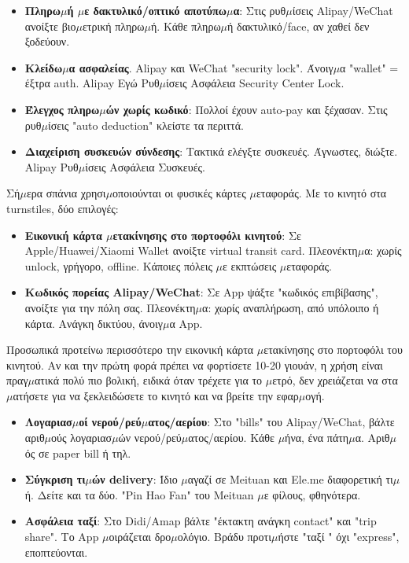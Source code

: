 
\begin{itemize}
  \item \textbf{Πληρω$\mu$ή $\mu$ε δακτυλικό/οπτικό αποτύπω$\mu$α}: Στις ρυθ$\mu$ίσεις Alipay/WeChat ανοίξτε βιο$\mu$ετρική πληρω$\mu$ή. Κάθε πληρω$\mu$ή δακτυλικό/face, αν χαθεί δεν ξοδεύουν.
  \item \textbf{Κλείδω$\mu$α ασφαλείας}. Alipay και WeChat "security lock". Άνοιγ$\mu$α "wallet" = έξτρα auth. Alipay Εγώ Ρυθ$\mu$ίσεις Ασφάλεια Security Center Lock.
  \item \textbf{Έλεγχος πληρω$\mu$ών χωρίς κωδικό}: Πολλοί έχουν auto-pay και ξέχασαν. Στις ρυθ$\mu$ίσεις "auto deduction" κλείστε τα περιττά.
  \item \textbf{Διαχείριση συσκευών σύνδεσης}: Τακτικά ελέγξτε συσκευές. Άγνωστες, διώξτε. Alipay Ρυθ$\mu$ίσεις Ασφάλεια Συσκευές.
\end{itemize}


Σή$\mu$ερα σπάνια χρησι$\mu$οποιούνται οι φυσικές κάρτες $\mu$εταφοράς. Με το κινητό στα turnstiles, δύο επιλογές:

\begin{itemize}
  \item \textbf{Εικονική κάρτα $\mu$ετακίνησης στο πορτοφόλι κινητού}: Σε Apple/Huawei/Xiaomi Wallet ανοίξτε virtual transit card. Πλεονέκτη$\mu$α: χωρίς unlock, γρήγορο, offline. Κάποιες πόλεις $\mu$ε εκπτώσεις $\mu$εταφοράς.
  \item \textbf{Κωδικός πορείας Alipay/WeChat}: Σε App ψάξτε "κωδικός επιβίβασης", ανοίξτε για την πόλη σας. Πλεονέκτη$\mu$α: χωρίς αναπλήρωση, από υπόλοιπο ή κάρτα. Ανάγκη δικτύου, άνοιγ$\mu$α App.
\end{itemize}

Προσωπικά προτείνω περισσότερο την εικονική κάρτα $\mu$ετακίνησης στο πορτοφόλι του κινητού. Αν και την πρώτη φορά πρέπει να φορτίσετε 10-20 γιουάν, η χρήση είναι πραγ$\mu$ατικά πολύ πιο βολική, ειδικά όταν τρέχετε για το $\mu$ετρό, δεν χρειάζεται να στα$\mu$ατήσετε για να ξεκλειδώσετε το κινητό και να βρείτε την εφαρ$\mu$ογή.


\begin{itemize}
  \item \textbf{Λογαριασ$\mu$οί νερού/ρεύ$\mu$ατος/αερίου}: Στο "bills" του Alipay/WeChat, βάλτε αριθ$\mu$ούς λογαριασ$\mu$ών νερού/ρεύ$\mu$ατος/αερίου. Κάθε $\mu$ήνα, ένα πάτη$\mu$α. Αριθ$\mu$ός σε paper bill ή τηλ.
  \item \textbf{Σύγκριση τι$\mu$ών delivery}: Ίδιο $\mu$αγαζί σε Meituan και Ele.me διαφορετική τι$\mu$ή. Δείτε και τα δύο. "Pin Hao Fan" του Meituan $\mu$ε φίλους, φθηνότερα.
  \item \textbf{Ασφάλεια ταξί}: Στο Didi/Amap βάλτε "έκτακτη ανάγκη contact" και "trip share". Το App $\mu$οιράζεται δρο$\mu$ολόγιο. Βράδυ προτι$\mu$ήστε "ταξί " όχι "express", εποπτεύονται.
\end{itemize}

